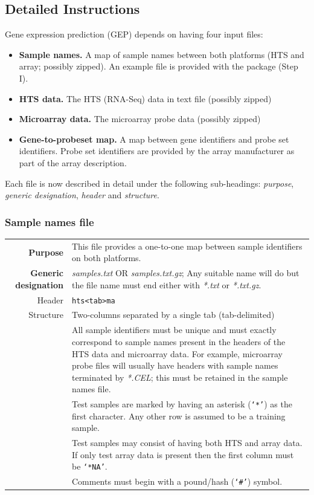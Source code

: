 \documentclass[a4paper,12pt]{article}
\begin{document}
\subsection{Detailed Instructions}
\label{gep:detailed}
Gene expression prediction (GEP) depends on having four input files:
\begin{itemize}
\item \textbf{Sample names.} A map of sample names between both platforms (HTS and array; possibly zipped). An example file is provided with the package (Step I).
\item \textbf{HTS data.} The HTS (RNA-Seq) data in text file (possibly zipped)
\item \textbf{Microarray data.} The microarray probe data (possibly zipped) 
\item \textbf{Gene-to-probeset map.} A map between gene identifiers and probe set identifiers. Probe set identifiers are provided by the array manufacturer as part of the array description.
\end{itemize}

Each file is now described in detail under the following sub-headings: \textit{purpose}, \textit{generic designation}, \textit{header} and \textit{structure}.

\subsubsection{Sample names file}
\label{gep:sample}

\begin{tabular}{rp{12cm}}
\textbf{Purpose} & This file provides a one-to-one map between sample identifiers on both platforms. \\
\textbf{Generic designation} & \textit{samples.txt} OR \textit{samples.txt.gz}; Any suitable name will do but the file name must end either with \textit{*.txt} or \textit{*.txt.gz}. \\
Header & \texttt{hts\textless tab\textgreater ma} \\
Structure & Two-columns separated by a single tab (tab-delimited) \\
  & All sample identifiers must be unique and must exactly correspond to sample names present in the headers of the HTS data and microarray data. For example, microarray probe files will usually have headers with sample names terminated by \textit{*.CEL}; this must be retained in the sample names file. \\
  & Test samples are marked by having an asterisk (\texttt{`*'}) as the first character. Any other row is assumed to be a training sample. \\
  & Test samples may consist of having both HTS and array data. If only test array data is present then the first column must be \texttt{`*NA'}. \\
  & Comments must begin with a pound/hash (\texttt{`\#'}) symbol. \\
\end{tabular}
\end{document}
